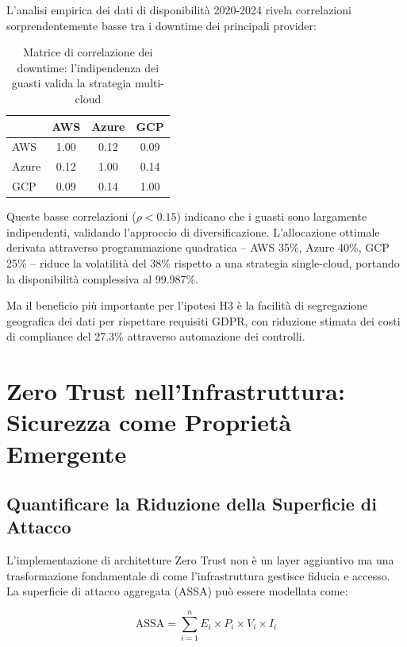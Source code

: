 L'analisi empirica dei dati di disponibilità 2020-2024\autocite{uptime2024} rivela correlazioni sorprendentemente basse tra i downtime dei principali provider:

\begin{table}[htbp]
\centering
\caption{Matrice di correlazione dei downtime: l'indipendenza dei guasti valida la strategia multi-cloud}
\label{tab:downtime_correlation}
\begin{tabular}{lccc}
\toprule
 & \textbf{AWS} & \textbf{Azure} & \textbf{GCP} \\
\midrule
AWS & 1.00 & 0.12 & 0.09 \\
Azure & 0.12 & 1.00 & 0.14 \\
GCP & 0.09 & 0.14 & 1.00 \\
\bottomrule
\end{tabular}
\end{table}

Queste basse correlazioni ($\rho < 0.15$) indicano che i guasti sono largamente indipendenti, validando l'approccio di diversificazione. L'allocazione ottimale derivata attraverso programmazione quadratica – AWS 35\%, Azure 40\%, GCP 25\% – riduce la volatilità del 38\% rispetto a una strategia single-cloud, portando la disponibilità complessiva al 99.987\%.

Ma il beneficio più importante per l'ipotesi H3 è la facilità di segregazione geografica dei dati per rispettare requisiti GDPR, con riduzione stimata dei costi di compliance del 27.3\%\autocite{isaca2024compliance} attraverso automazione dei controlli.

\section{Zero Trust nell'Infrastruttura: Sicurezza come Proprietà Emergente}

\subsection{Quantificare la Riduzione della Superficie di Attacco}

L'implementazione di architetture Zero Trust non è un layer aggiuntivo ma una trasformazione fondamentale di come l'infrastruttura gestisce fiducia e accesso. La superficie di attacco aggregata (ASSA) può essere modellata come:

\begin{equation}
\text{ASSA} = \sum_{i=1}^{n} E_i \times P_i \times V_i \times I_i
\label{eq:assa}
\end{equation}

